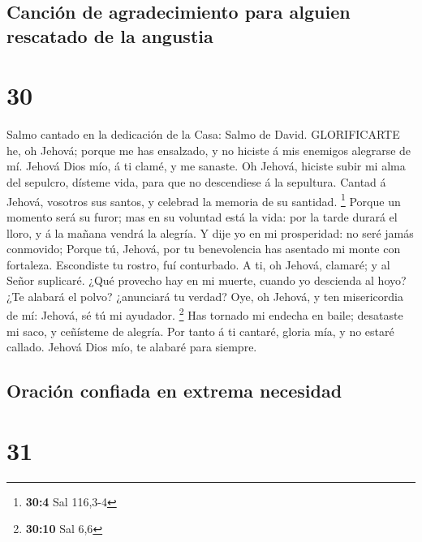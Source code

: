 \hypertarget{canciuxf3n-de-agradecimiento-para-alguien-rescatado-de-la-angustia}{%
\subsection{Canción de agradecimiento para alguien rescatado de la
angustia}\label{canciuxf3n-de-agradecimiento-para-alguien-rescatado-de-la-angustia}}

\hypertarget{section-29}{%
\section{30}\label{section-29}}

 Salmo cantado en la dedicación de la Casa: Salmo de David.
GLORIFICARTE he, oh Jehová; porque me has ensalzado, y no hiciste á mis
enemigos alegrarse de mí.  Jehová Dios mío, á ti clamé, y me
sanaste.  Oh Jehová, hiciste subir mi alma del sepulcro,
dísteme vida, para que no descendiese á la sepultura. 
Cantad á Jehová, vosotros sus santos, y celebrad la memoria de su
santidad. \footnote{\textbf{30:4} Sal 116,3-4}  Porque un
momento será su furor; mas en su voluntad está la vida: por la tarde
durará el lloro, y á la mañana vendrá la alegría.  Y dije yo
en mi prosperidad: no seré jamás conmovido;  Porque tú,
Jehová, por tu benevolencia has asentado mi monte con fortaleza.
Escondiste tu rostro, fuí conturbado.  A ti, oh Jehová,
clamaré; y al Señor suplicaré.  ¿Qué provecho hay en mi
muerte, cuando yo descienda al hoyo? ¿Te alabará el polvo? ¿anunciará tu
verdad?  Oye, oh Jehová, y ten misericordia de mí: Jehová,
sé tú mi ayudador. \footnote{\textbf{30:10} Sal 6,6}  Has
tornado mi endecha en baile; desataste mi saco, y ceñísteme de alegría.
 Por tanto á ti cantaré, gloria mía, y no estaré callado.
Jehová Dios mío, te alabaré para siempre.

\hypertarget{oraciuxf3n-confiada-en-extrema-necesidad}{%
\subsection{Oración confiada en extrema
necesidad}\label{oraciuxf3n-confiada-en-extrema-necesidad}}

\hypertarget{section-30}{%
\section{31}\label{section-30}}

